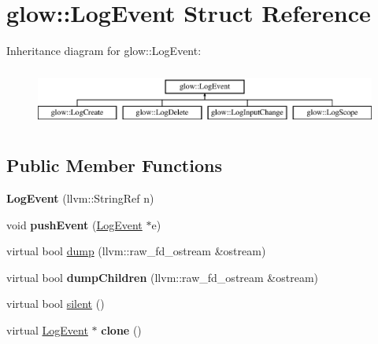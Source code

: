 \hypertarget{structglow_1_1_log_event}{}\section{glow\+:\+:Log\+Event Struct Reference}
\label{structglow_1_1_log_event}
Inheritance diagram for glow\+:\+:Log\+Event\+:\begin{figure}[H]
\begin{center}
\leavevmode
\includegraphics[height=1.944445cm]{structglow_1_1_log_event}
\end{center}
\end{figure}
\subsection*{Public Member Functions}
\begin{DoxyCompactItemize}
\item 
\mbox{\label{structglow_1_1_log_event_a10198e509d56beafa5b2ec13f0de0148}} 
{\bfseries Log\+Event} (llvm\+::\+String\+Ref n)
\item 
\mbox{\label{structglow_1_1_log_event_ae82ac2c7b5b7bc73acdc17b25f46c7ad}} 
void {\bfseries push\+Event} (\hyperlink{structglow_1_1_log_event}{Log\+Event} $\ast$e)
\item 
virtual bool \hyperlink{structglow_1_1_log_event_a1c25aa690ea65f6b184ba3133fd6c564}{dump} (llvm\+::raw\+\_\+fd\+\_\+ostream \&ostream)
\item 
\mbox{\label{structglow_1_1_log_event_a8d8adbcb0562a0168e2691a200e9193a}} 
virtual bool {\bfseries dump\+Children} (llvm\+::raw\+\_\+fd\+\_\+ostream \&ostream)
\item 
virtual bool \hyperlink{structglow_1_1_log_event_acca8974ed27e0896a63af715ec912fa1}{silent} ()
\item 
\mbox{\label{structglow_1_1_log_event_ac85196b0260f22e94bd8c97d185fbd38}} 
virtual \hyperlink{structglow_1_1_log_event}{Log\+Event} $\ast$ {\bfseries clone} ()
\end{DoxyCompactItemize}
